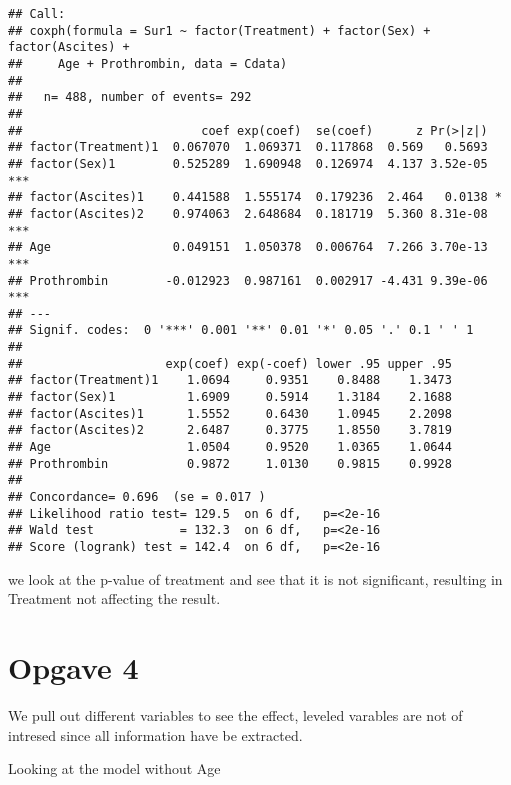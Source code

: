 \documentclass[
]{article}
\newenvironment{Shaded}{\begin{snugshade}}{\end{snugshade}}
\newcommand{\CommentTok}[1]{\textcolor[rgb]{0.56,0.35,0.01}{\textit{#1}}}
\newcommand{\DataTypeTok}[1]{\textcolor[rgb]{0.13,0.29,0.53}{#1}}
\newcommand{\KeywordTok}[1]{\textcolor[rgb]{0.13,0.29,0.53}{\textbf{#1}}}
\newcommand{\NormalTok}[1]{#1}
\newcommand{\OperatorTok}[1]{\textcolor[rgb]{0.81,0.36,0.00}{\textbf{#1}}}
\newcommand{\StringTok}[1]{\textcolor[rgb]{0.31,0.60,0.02}{#1}}
\begin{document}
\begin{verbatim}
## Call:
## coxph(formula = Sur1 ~ factor(Treatment) + factor(Sex) + factor(Ascites) + 
##     Age + Prothrombin, data = Cdata)
## 
##   n= 488, number of events= 292 
## 
##                         coef exp(coef)  se(coef)      z Pr(>|z|)    
## factor(Treatment)1  0.067070  1.069371  0.117868  0.569   0.5693    
## factor(Sex)1        0.525289  1.690948  0.126974  4.137 3.52e-05 ***
## factor(Ascites)1    0.441588  1.555174  0.179236  2.464   0.0138 *  
## factor(Ascites)2    0.974063  2.648684  0.181719  5.360 8.31e-08 ***
## Age                 0.049151  1.050378  0.006764  7.266 3.70e-13 ***
## Prothrombin        -0.012923  0.987161  0.002917 -4.431 9.39e-06 ***
## ---
## Signif. codes:  0 '***' 0.001 '**' 0.01 '*' 0.05 '.' 0.1 ' ' 1
## 
##                    exp(coef) exp(-coef) lower .95 upper .95
## factor(Treatment)1    1.0694     0.9351    0.8488    1.3473
## factor(Sex)1          1.6909     0.5914    1.3184    2.1688
## factor(Ascites)1      1.5552     0.6430    1.0945    2.2098
## factor(Ascites)2      2.6487     0.3775    1.8550    3.7819
## Age                   1.0504     0.9520    1.0365    1.0644
## Prothrombin           0.9872     1.0130    0.9815    0.9928
## 
## Concordance= 0.696  (se = 0.017 )
## Likelihood ratio test= 129.5  on 6 df,   p=<2e-16
## Wald test            = 132.3  on 6 df,   p=<2e-16
## Score (logrank) test = 142.4  on 6 df,   p=<2e-16
\end{verbatim}

we look at the p-value of treatment and see that it is not significant,
resulting in Treatment not affecting the result.

\hypertarget{opgave-4}{%
\section{Opgave 4}\label{opgave-4}}

We pull out different variables to see the effect, leveled varables are
not of intresed since all information have be extracted.

Looking at the model without Age

\begin{Shaded}
\end{Shaded}
\end{document}
